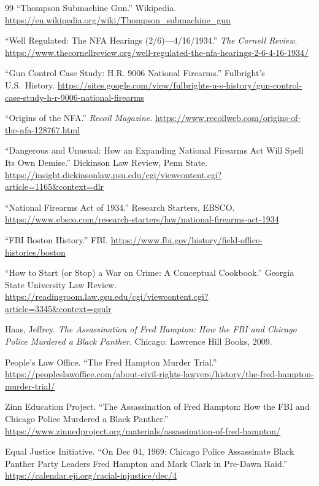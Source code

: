 \documentclass[12pt,openany]{book}
\begin{document}
\begin{thebibliography}{99}
``Thompson Submachine Gun.'' Wikipedia. \url{https://en.wikipedia.org/wiki/Thompson_submachine_gun}

``Well Regulated: The NFA Hearings (2/6)---4/16/1934.'' \textit{The Cornell Review}. \url{https://www.thecornellreview.org/well-regulated-the-nfa-hearings-2-6-4-16-1934/}

``Gun Control Case Study: H.R. 9006 National Firearms.'' Fulbright's U.S.\ History. \url{https://sites.google.com/view/fulbrights-u-s-history/gun-control-case-study-h-r-9006-national-firearms}

``Origins of the NFA.'' \textit{Recoil Magazine}. \url{https://www.recoilweb.com/origins-of-the-nfa-128767.html}

``Dangerous and Unusual: How an Expanding National Firearms Act Will Spell Its Own Demise.'' Dickinson Law Review, Penn State. \url{https://insight.dickinsonlaw.psu.edu/cgi/viewcontent.cgi?article=1165&context=dlr}

``National Firearms Act of 1934.'' Research Starters, EBSCO. \url{https://www.ebsco.com/research-starters/law/national-firearms-act-1934}

``FBI Boston History.'' FBI. \url{https://www.fbi.gov/history/field-office-histories/boston}

``How to Start (or Stop) a War on Crime: A Conceptual Cookbook.'' Georgia State University Law Review. \url{https://readingroom.law.gsu.edu/cgi/viewcontent.cgi?article=3345&context=gsulr}


Haas, Jeffrey. \textit{The Assassination of Fred Hampton: How the FBI and Chicago Police Murdered a Black Panther}. Chicago: Lawrence Hill Books, 2009.

People's Law Office. ``The Fred Hampton Murder Trial.'' \url{https://peopleslawoffice.com/about-civil-rights-lawyers/history/the-fred-hampton-murder-trial/}

Zinn Education Project. ``The Assassination of Fred Hampton: How the FBI and Chicago Police Murdered a Black Panther.'' \url{https://www.zinnedproject.org/materials/assassination-of-fred-hampton/}

Equal Justice Initiative. ``On Dec 04, 1969: Chicago Police Assassinate Black Panther Party Leaders Fred Hampton and Mark Clark in Pre-Dawn Raid.'' \url{https://calendar.eji.org/racial-injustice/dec/4}


\end{thebibliography}
\end{document}
